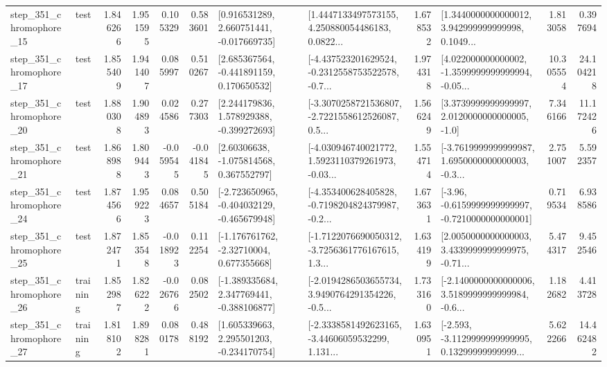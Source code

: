 \begin{tabular}{llrrrrllrlrr}
  step\_351\_chromophore\_15 &      test &      1.846266 &    1.951595 &      0.105329 &  0.583601 &    [0.916531289, 2.660751441, -0.017669735] &  [1.4447133497573155, 4.250880054486183, 0.0822... &       1.678532 &  [1.3440000000000012, 3.942999999999998, 0.1049... &            1.813058 &          0.397694 \\
  step\_351\_chromophore\_17 &      test &      1.855409 &    1.941407 &      0.085997 &  0.510267 &    [2.685367564, -0.441891159, 0.170650532] &  [-4.437523201629524, -0.2312558753522578, -0.7... &       1.974318 &  [4.022000000000002, -1.3599999999999994, -0.05... &           10.305554 &         24.104218 \\
  step\_351\_chromophore\_20 &      test &      1.880308 &    1.904893 &      0.024586 &  0.277303 &    [2.244179836, 1.578929388, -0.399272693] &  [-3.3070258721536807, -2.7221558612526087, 0.5... &       1.566249 &     [3.3739999999999997, 2.0120000000000005, -1.0] &            7.346166 &         11.172426 \\
  step\_351\_chromophore\_21 &      test &      1.868988 &    1.809443 &     -0.059545 & -0.041845 &     [2.60306638, -1.075814568, 0.367552797] &  [-4.030946740021772, 1.5923110379261973, -0.03... &       1.554714 &  [-3.7619999999999987, 1.6950000000000003, -0.3... &            2.751007 &          5.592357 \\
  step\_351\_chromophore\_24 &      test &      1.874566 &    1.959223 &      0.084657 &  0.505184 &  [-2.723650965, -0.404032129, -0.465679948] &  [-4.353400628405828, -0.7198204824379987, -0.2... &       1.673631 &  [-3.96, -0.6159999999999997, -0.7210000000000001] &            0.719534 &          6.938586 \\
  step\_351\_chromophore\_25 &      test &      1.872471 &    1.853548 &     -0.018923 &  0.112254 &    [-1.176761762, -2.32710004, 0.677355668] &  [-1.7122076690050312, -3.7256361776167615, 1.3... &       1.634199 &  [2.0050000000000003, 3.4339999999999975, -0.71... &            5.474317 &          9.452546 \\
  step\_351\_chromophore\_26 &  training &      1.852987 &    1.826222 &     -0.026766 &  0.082502 &   [-1.389335684, 2.347769441, -0.388106877] &  [-2.0194286503655734, 3.9490764291354226, -0.5... &       1.733160 &  [-2.1400000000000006, 3.5189999999999984, -0.6... &            1.182682 &          4.413728 \\
  step\_351\_chromophore\_27 &  training &      1.818102 &    1.898281 &      0.080178 &  0.488192 &    [1.605339663, 2.295501203, -0.234170754] &  [-2.3338581492623165, -3.44606059532299, 1.131... &       1.630951 &  [-2.593, -3.1129999999999995, 0.13299999999999... &            5.622266 &         14.462482 \\

\end{tabular}

